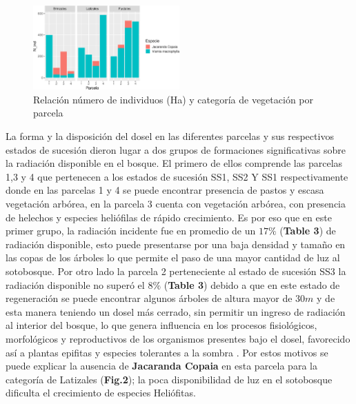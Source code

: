 \documentclass[letterpaper,9pt,twocolumn,twoside,]{pinp}
\begin{document}
\begin{figure}

{\centering \includegraphics[width=0.5\textwidth]{report_ecology_files/figure-latex/unnamed-chunk-10-1} 

}

\caption{Relación número de individuos (Ha) y categoría de vegetación por parcela}\label{fig:unnamed-chunk-10}
\end{figure}

La forma y la disposición del dosel en las diferentes parcelas y sus
respectivos estados de sucesión dieron lugar a dos grupos de formaciones
significativas sobre la radiación disponible en el bosque. El primero de
ellos comprende las parcelas 1,3 y 4 que pertenecen a los estados de
sucesión SS1, SS2 Y SS1 respectivamente donde en las parcelas 1 y 4 se
puede encontrar presencia de pastos y escasa vegetación arbórea, en la
parcela 3 cuenta con vegetación arbórea, con presencia de helechos y
especies heliófilas de rápido crecimiento. Es por eso que en este primer
grupo, la radiación incidente fue en promedio de un \(17 \%\)
(\textbf{Table 3}) de radiación disponible, esto puede presentarse por
una baja densidad y tamaño en las copas de los árboles\citep{plateros}
lo que permite el paso de una mayor cantidad de luz al sotobosque. Por
otro lado la parcela 2 perteneciente al estado de sucesión SS3 la
radiación disponible no superó el \(8 \%\) (\textbf{Table 3}) debido a
que en este estado de regeneración se puede encontrar algunos árboles de
altura mayor de \(30 m\) y de esta manera teniendo un dosel más cerrado,
sin permitir un ingreso de radiación al interior del bosque, lo que
genera influencia en los procesos fisiológicos, morfológicos y
reproductivos de los organismos presentes bajo el dosel, favorecido así
a plantas epifitas y especies tolerantes a la sombra \citep{plateros}.
Por estos motivos se puede explicar la ausencia de \textbf{Jacaranda
Copaia} en esta parcela para la categoría de Latizales (\textbf{Fig.2});
la poca disponibilidad de luz en el sotobosque dificulta el crecimiento
de especies Heliófitas.
\end{document}
